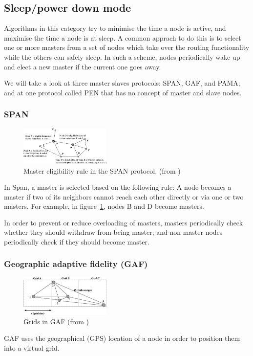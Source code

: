 \documentclass[conference]{IEEEtran}
\begin{document}
\subsection{Sleep/power­ down mode}
Algorithms in this category try to minimise the time a node is active, and
maximise the time a node is at sleep. A common apprach to do this is to select
one or more masters from a set of nodes which take over the routing functionality
while the others can safely sleep. In such a scheme, nodes periodically wake up
and elect a new master if the current one goes away.

We will take a look at three master slaves protocols: SPAN, GAF, and PAMA;
and at one protocol called PEN that has no concept of master and slave nodes.

\subsubsection{SPAN}
\begin{figure}
\includegraphics[width=0.4\textwidth]{images/span-master-example}
\caption{Master eligibility rule in the SPAN protocol. (from \cite{alotaibi2012survey})}
\label{spanmaster}
\end{figure}
In Span\cite{chen2002span}, a master is selected based on the following rule:
A node becomes a master if two of its neighbors cannot reach each other directly
or via one or two masters. For example, in figure~\ref{spanmaster}, nodes B and
D become masters.

In order to prevent or reduce overloading of masters, masters periodically
check whether they should withdraw from being master; and non-master nodes
periodically check if they should become master.


\subsubsection{Geographic adaptive fidelity (GAF)}
\begin{figure}
\includegraphics[width=0.4\textwidth]{images/gaf-grids}
\caption{Grids in GAF (from \cite{alotaibi2012survey})}
\label{gafgrids}
\end{figure}
GAF\cite{xu2001geography} uses the geographical (GPS) location of a node in
order to position them into a virtual grid.
\end{document}
